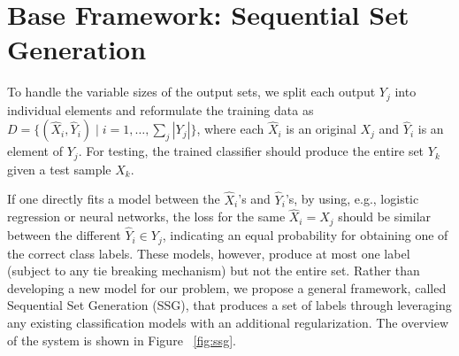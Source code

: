 \documentclass[letterpaper]{article} %
\begin{document}
\section{Base Framework: Sequential Set Generation }
To handle the variable sizes of the output sets, we split each output $Y_j$ into individual elements and reformulate the training data as $D = \{(\hat{X}_i, \hat{Y}_i) \mid i=1, \ldots, \sum_j|Y_j|\}$, where each $\hat{X}_i$ is an original $X_j$ and $\hat{Y}_i$ is an element of $Y_j$. For testing, the trained classifier should produce the entire set $Y_k$ given a test sample $X_k$.


If one directly fits a model between the $\hat{X}_i$'s and $\hat{Y}_i$'s, by using, e.g., logistic regression or neural networks, the loss for the same $\hat{X}_i=X_j$ should be similar between the different $\hat{Y}_i \in Y_j$, indicating an equal probability for obtaining one of the correct class labels. These models, however, produce at most one label (subject to any tie breaking mechanism) but not the entire set. Rather than developing a new model for our problem, we propose a general framework, called Sequential Set Generation (SSG), that produces a set of labels through leveraging any existing classification models with an additional regularization. The overview of the system is shown in Figure ~\ref{fig:ssg}.
\end{document}

